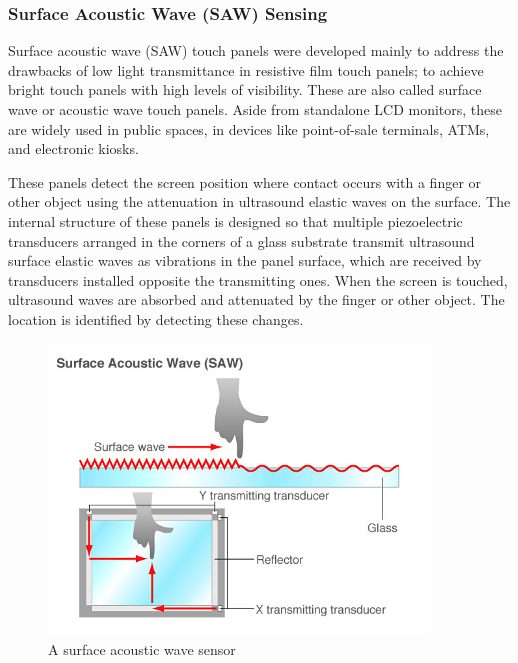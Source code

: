 \documentclass[11pt]{report}
\begin{document}
\subsubsection{Surface Acoustic Wave (SAW) Sensing}

Surface acoustic wave (SAW) touch panels were developed mainly to address the drawbacks of low light transmittance in resistive film touch panels; to achieve bright touch panels with high levels of visibility. 
These are also called surface wave or acoustic wave touch panels. 
Aside from standalone LCD monitors, these are widely used in public spaces, in devices like point-of-sale terminals, ATMs, and electronic kiosks.

These panels detect the screen position where contact occurs with a finger or other object using the attenuation in ultrasound elastic waves on the surface. 
The internal structure of these panels is designed so that multiple piezoelectric transducers arranged in the corners of a glass substrate transmit ultrasound surface elastic waves as vibrations in the panel surface, which are received by transducers installed opposite the transmitting ones. 
When the screen is touched, ultrasound waves are absorbed and attenuated by the finger or other object. 
The location is identified by detecting these changes.

\begin{center}
\begin{figure}
\includegraphics[width=0.9\textwidth]{saw}
\caption{A surface acoustic wave sensor}
\end{figure}
\end{center}
\end{document}
